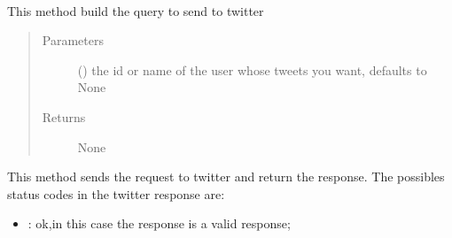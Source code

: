 \documentclass[letterpaper,10pt,english]{sphinxmanual}
\begin{document}
\begin{fulllineitems}
\label{\detokenize{code_comment/tweet_search:hate_tweet_map.tweets_searcher.SearchTweets.SearchTweets}}~

\begin{fulllineitems}
\label{\detokenize{code_comment/tweet_search:hate_tweet_map.tweets_searcher.SearchTweets.SearchTweets.__build_query}}
\sphinxAtStartPar
This method build the query to send to twitter
\begin{quote}\begin{description}
\item[{Parameters}] \leavevmode
\sphinxAtStartPar
{} (\sphinxstyleliteralemphasis{\sphinxupquote{, }}) \textendash{} the id or name of the user whose tweets you want, defaults to None

\item[{Returns}] \leavevmode
\sphinxAtStartPar
None

\end{description}\end{quote}

\end{fulllineitems}


\begin{fulllineitems}
\label{\detokenize{code_comment/tweet_search:hate_tweet_map.tweets_searcher.SearchTweets.SearchTweets.__connect_to_endpoint}}
\sphinxAtStartPar
This method sends the request to twitter and return the response.
The possibles status codes in the twitter response are:
\begin{itemize}
\item {} 
: ok,in this case the response is a valid response;


\end{itemize}
\end{fulllineitems}
\end{fulllineitems}
\end{document}
